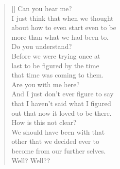 \documentclass[12pt,oneside,openany]{memoir}
\newcommand{\attrib}[1]{%
\nopagebreak{\raggedleft\footnotesize #1\par}}
\begin{document}
\author{Noah Eisen}
\thispagestyle{empty}

\bigskip
\settowidth{\versewidth}{And I just don’t ever figure to say}
\begin{verse}[\versewidth]
Can you hear me?\\
\bigskip
\vin I just think that when we thought\\
\vin about how to even start even to be\\
\vin more than what we had been to.\\
\bigskip
Do you understand?\\
\bigskip
\vin Before we were trying once at\\
\vin last to be figured by the time\\
\vin that time was coming to them.\\
\bigskip
Are you with me here?\\
\bigskip
\vin And I just don’t ever figure to say\\
\vin that I haven’t said what I figured\\
\vin out that now it loved to be there.\\
\bigskip
How is this not clear?\\
\bigskip
\vin We should have been with that\\
\vin other that we decided ever to\\
\vin become from our further selves.\\
\bigskip
Well? Well??
\end{verse}
\attrib{Noah Eisen}
\end{document}
